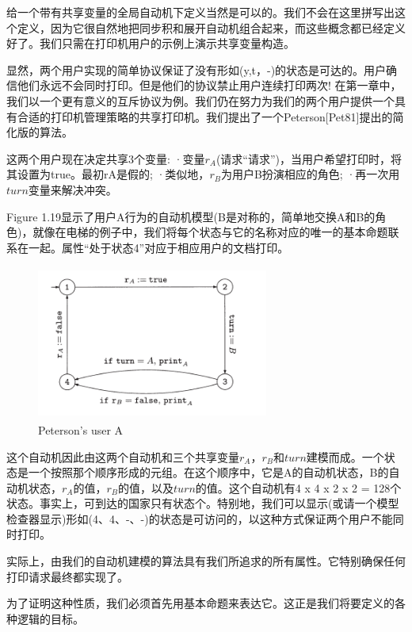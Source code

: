 \documentclass{book}
\begin{document}
    给一个带有共享变量的全局自动机下定义当然是可以的。我们不会在这里拼写出这个定义，因为它很自然地把同步积和展开自动机组合起来，而这些概念都已经定义好了。我们只需在打印机用户的示例上演示共享变量构造。

    显然，两个用户实现的简单协议保证了没有形如(y,t，-)的状态是可达的。用户确信他们永远不会同时打印。但是他们的协议禁止用户连续打印两次!
    在第一章中，我们以一个更有意义的互斥协议为例。我们仍在努力为我们的两个用户提供一个具有合适的打印机管理策略的共享打印机。我们提出了一个Peterson[Pet81]提出的简化版的算法。

    这两个用户现在决定共享3个变量:
    ·变量$r_A$(请求“请求”)，当用户希望打印时，将其设置为true。最初rA是假的;
    ·类似地，$r_B$为用户B扮演相应的角色;
    ·再一次用$turn$变量来解决冲突。

    Figure 1.19显示了用户A行为的自动机模型(B是对称的，简单地交换A和B的角色)，就像在电梯的例子中，我们将每个状态与它的名称对应的唯一的基本命题联系在一起。属性“处于状态4”对应于相应用户的文档打印。
    \begin{figure}
    \centering
    \includegraphics[height=2in,width=3.0in]{1_19.png}
    \caption{Peterson's user A}
    \end{figure}

    这个自动机因此由这两个自动机和三个共享变量$r_A$，$r_B$和$turn$建模而成。一个状态是一个按照那个顺序形成的元组。在这个顺序中，它是A的自动机状态，B的自动机状态，$r_A$的值，$r_B$的值，以及$turn$的值。这个自动机有4 x 4 x 2 x 2 = 128个状态。事实上，可到达的国家只有状态个。特别地，我们可以显示(或请一个模型检查器显示)形如(4、4、-、-)的状态是可访问的，以这种方式保证两个用户不能同时打印。

    实际上，由我们的自动机建模的算法具有我们所追求的所有属性。它特别确保任何打印请求最终都实现了。

    为了证明这种性质，我们必须首先用基本命题来表达它。这正是我们将要定义的各种逻辑的目标。
\end{document}

